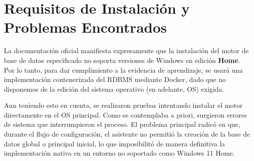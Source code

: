 \section{Requisitos de Instalación y Problemas Encontrados}

La documentación oficial manifiesta expresamente que la instalación del motor de base de datos especificado no soporta versiones de Windows en edición \textbf{Home}. Por lo tanto, para dar cumplimiento a la evidencia de aprendizaje, se usará una implementación contenerizada del RDBMS mediante Docker, dado que no disponemos de la edición del sistema operativo (en adelante, OS) exigida.

Aun teniendo esto en cuenta, se realizaron pruebas intentando instalar el motor directamente en el OS principal. Como se contemplaba a priori, surgieron errores de sistema que interrumpieron el proceso. El problema principal radicó en que, durante el flujo de configuración, el asistente no permitió la creación de la base de datos global o principal inicial, lo que imposibilitó de manera definitiva la implementación nativa en un entorno no soportado como Windows 11 Home.